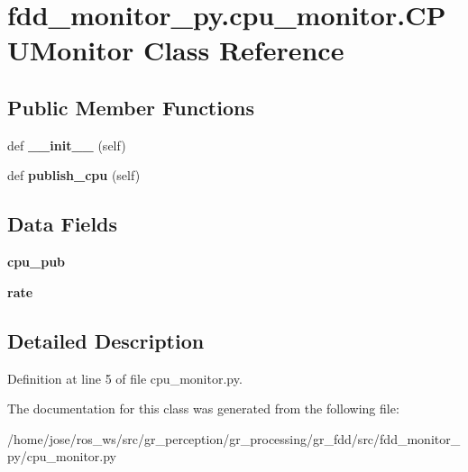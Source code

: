 \hypertarget{classfdd__monitor__py_1_1cpu__monitor_1_1CPUMonitor}{}\section{fdd\+\_\+monitor\+\_\+py.\+cpu\+\_\+monitor.\+C\+P\+U\+Monitor Class Reference}
\label{classfdd__monitor__py_1_1cpu__monitor_1_1CPUMonitor}
\subsection*{Public Member Functions}
\begin{DoxyCompactItemize}
\item 
\mbox{\label{classfdd__monitor__py_1_1cpu__monitor_1_1CPUMonitor_a43204523a631581acd3daa414a830452}} 
def {\bfseries \+\_\+\+\_\+init\+\_\+\+\_\+} (self)
\item 
\mbox{\label{classfdd__monitor__py_1_1cpu__monitor_1_1CPUMonitor_abd0428518b25d2602612304d59b271ac}} 
def {\bfseries publish\+\_\+cpu} (self)
\end{DoxyCompactItemize}
\subsection*{Data Fields}
\begin{DoxyCompactItemize}
\item 
\mbox{\label{classfdd__monitor__py_1_1cpu__monitor_1_1CPUMonitor_a6afad9bdf61e3dc2d9a2ab1013849088}} 
{\bfseries cpu\+\_\+pub}
\item 
\mbox{\label{classfdd__monitor__py_1_1cpu__monitor_1_1CPUMonitor_adce2467c2c36295024033d14f2cef1d0}} 
{\bfseries rate}
\end{DoxyCompactItemize}


\subsection{Detailed Description}


Definition at line 5 of file cpu\+\_\+monitor.\+py.



The documentation for this class was generated from the following file\+:\begin{DoxyCompactItemize}
\item 
/home/jose/ros\+\_\+ws/src/gr\+\_\+perception/gr\+\_\+processing/gr\+\_\+fdd/src/fdd\+\_\+monitor\+\_\+py/cpu\+\_\+monitor.\+py\end{DoxyCompactItemize}
